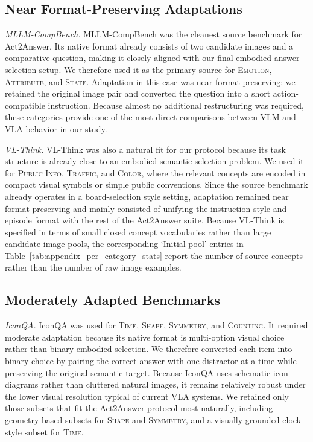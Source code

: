 \documentclass{llmxive}
\begin{document}
\subsection{Near Format-Preserving Adaptations}

\noindent\textit{MLLM-CompBench.}
MLLM-CompBench was the cleanest source benchmark for Act2Answer. Its native format already consists of two candidate images and a comparative question, making it closely aligned with our final embodied answer-selection setup. We therefore used it as the primary source for \textsc{Emotion}, \textsc{Attribute}, and \textsc{State}. Adaptation in this case was near format-preserving: we retained the original image pair and converted the question into a short action-compatible instruction. Because almost no additional restructuring was required, these categories provide one of the most direct comparisons between VLM and VLA behavior in our study.

\noindent\textit{VL-Think.}
VL-Think was also a natural fit for our protocol because its task structure is already close to an embodied semantic selection problem. We used it for \textsc{Public Info}, \textsc{Traffic}, and \textsc{Color}, where the relevant concepts are encoded in compact visual symbols or simple public conventions. Since the source benchmark already operates in a board-selection style setting, adaptation remained near format-preserving and mainly consisted of unifying the instruction style and episode format with the rest of the Act2Answer suite. Because VL-Think is specified in terms of small closed concept vocabularies rather than large candidate image pools, the corresponding `Initial pool' entries in Table~\ref{tab:appendix_per_category_stats} report the number of source concepts rather than the number of raw image examples.

\subsection{Moderately Adapted Benchmarks}

\noindent\textit{IconQA.}
IconQA was used for \textsc{Time}, \textsc{Shape}, \textsc{Symmetry}, and \textsc{Counting}. It required moderate adaptation because its native format is multi-option visual choice rather than binary embodied selection. We therefore converted each item into binary choice by pairing the correct answer with one distractor at a time while preserving the original semantic target. Because IconQA uses schematic icon diagrams rather than cluttered natural images, it remains relatively robust under the lower visual resolution typical of current VLA systems. We retained only those subsets that fit the Act2Answer protocol most naturally, including geometry-based subsets for \textsc{Shape} and \textsc{Symmetry}, and a visually grounded clock-style subset for \textsc{Time}.
\end{document}
